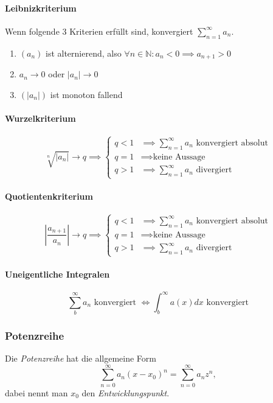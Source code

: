 \documentclass[a4paper, 9pt, DIV=24]{scrartcl}
\newcommand{\N}{\mathbb{N}}
\begin{document}
\paragraph{Leibnizkriterium}
Wenn folgende 3 Kriterien erfüllt sind, konvergiert $\sum_{n=1}^\infty a_n$.
\begin{enumerate}[label={(}\arabic*{)}]
  \item $(a_n)$ ist alternierend, also $\forall n\in\N: a_n < 0 \implies a_{n+1} > 0$
  \item $a_n \to 0$ oder $|a_n| \to 0$
  \item $(|a_n|)$ ist monoton fallend
\end{enumerate}

\paragraph{Wurzelkriterium}
\[
  \sqrt[n]{\left | a_n \right |} \to q \implies
  \begin{cases}
    q < 1 & \implies \sum_{n=1}^\infty a_n \text{ konvergiert absolut}\\
    q = 1 & \implies \text{keine Aussage}\\
    q > 1 & \implies \sum_{n=1}^\infty a_n \text{ divergiert}
  \end{cases}
\]
\paragraph{Quotientenkriterium}
\[
\left| \frac{a_{n+1}}{a_n} \right| \to q \implies
\begin{cases}
  q < 1 & \implies \sum_{n=1}^\infty a_n \text{ konvergiert absolut} \\
  q = 1 & \implies \text{keine Aussage}\\
  q > 1 & \implies \sum_{n=1}^\infty a_n \text{ divergiert}
\end{cases}
\]

\paragraph{Uneigentliche Integralen}
$$\sum_b^{\infty} a_n \mbox{ konvergiert } \iff \int_b^{\infty} a(x)dx \mbox{ konvergiert}$$

\subsubsection{Potenzreihe}
Die \emph{Potenzreihe} hat die allgemeine Form \[ \sum_{n=0}^\infty a_n (x - x_0)^n = \sum_{n=0}^\infty a_n z^n, \]
dabei nennt man $x_0$ den \emph{Entwicklungspunkt}.
\end{document}
